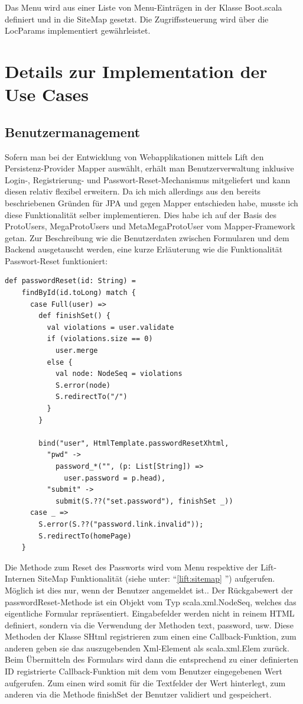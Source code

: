 Das Menu wird aus einer Liste von Menu-Eintr\"agen in der Klasse Boot.scala definiert und in die SiteMap gesetzt. Die Zugriffssteuerung wird \"uber die LocParams implementiert gew\"ahrleistet. 
 
 \section{Details zur Implementation der Use Cases}
 \subsection{Benutzermanagement}
Sofern man bei der Entwicklung von Webapplikationen mittels Lift den Persistenz-Provider Mapper ausw\"ahlt, erh\"alt man Benutzerverwaltung inklusive Login-, Registrierung- und Passwort-Reset-Mechanismus mitgeliefert und kann diesen relativ flexibel erweitern. Da ich mich allerdings aus den bereits beschriebenen Gr\"unden f\"ur JPA und gegen Mapper entschieden habe, musste ich diese Funktionalit\"at selber implementieren. Dies habe ich auf der Basis des ProtoUsers, MegaProtoUsers und MetaMegaProtoUser vom Mapper-Framework getan. Zur Beschreibung wie die Benutzerdaten zwischen Formularen und dem Backend ausgetauscht werden, eine kurze Erl\"auterung wie die Funktionalit\"at Passwort-Reset funktioniert:

\begin{lstlisting}[caption=Implementation Funktionalit\"at Passwort-Reset]
def passwordReset(id: String) =
    findById(id.toLong) match {
      case Full(user) =>
        def finishSet() {
          val violations = user.validate
          if (violations.size == 0)
            user.merge
          else {
            val node: NodeSeq = violations
            S.error(node)
            S.redirectTo("/")
          }
        }

        bind("user", HtmlTemplate.passwordResetXhtml,
          "pwd" -> 
            password_*("", (p: List[String]) =>
              user.password = p.head),
          "submit" -> 
            submit(S.??("set.password"), finishSet _))
      case _ => 
        S.error(S.??("password.link.invalid")); 
        S.redirectTo(homePage)
    }
\end{lstlisting}
Die Methode zum Reset des Passworts wird vom Menu respektive der Lift-Internen SiteMap Funktionalit\"at (siehe unter: ``\ref{lift:sitemap} '') aufgerufen. M\"oglich ist dies nur, wenn der Benutzer angemeldet ist..  Der R\"uckgabewert der passwordReset-Methode ist ein Objekt vom Typ scala.xml.NodeSeq, welches das eigentliche Formular repr\"asentiert. Eingabefelder werden nicht in reinem HTML definiert, sondern via die Verwendung der Methoden text, password, usw. Diese Methoden der Klasse SHtml registrieren zum einen eine Callback-Funktion, zum anderen geben sie das auszugebenden Xml-Element als scala.xml.Elem zur\"uck. Beim \"Ubermitteln des Formulars wird dann die entsprechend zu einer definierten ID registrierte Callback-Funktion mit dem vom Benutzer eingegebenen Wert aufgerufen. Zum einen wird somit f\"ur die Textfelder der Wert hinterlegt, zum anderen via die Methode finishSet der Benutzer validiert und gespeichert. 

